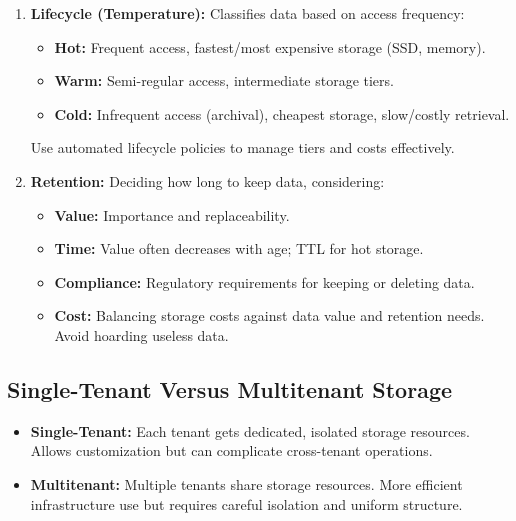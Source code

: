 \begin{enumerate}
    \item \textbf{Lifecycle (Temperature):} Classifies data based on
    access frequency:
    \begin{itemize}
        \item \textbf{Hot:} Frequent access, fastest/most expensive storage
        (SSD, memory).
        \item \textbf{Warm:} Semi-regular access, intermediate storage tiers.
        \item \textbf{Cold:} Infrequent access (archival), cheapest storage,
        slow/costly retrieval.
    \end{itemize}
    Use automated lifecycle policies to manage tiers and costs effectively.

    \item \textbf{Retention:} Deciding how long to keep data, considering: 
    \begin{itemize}
        \item \textbf{Value:} Importance and replaceability.
        \item \textbf{Time:} Value often decreases with age; TTL for hot
        storage.
        \item \textbf{Compliance:} Regulatory requirements for keeping or
        deleting data.
        \item \textbf{Cost:} Balancing storage costs against data value and
        retention needs. Avoid hoarding useless data.
    \end{itemize}

\end{enumerate}



\subsection*{Single-Tenant Versus Multitenant Storage}

\begin{itemize}
    \item \textbf{Single-Tenant:} Each tenant gets dedicated, isolated
    storage resources. Allows customization but can complicate cross-tenant
    operations.

    \item \textbf{Multitenant:} Multiple tenants share storage resources.
    More efficient infrastructure use but requires careful isolation and
    uniform structure.
\end{itemize}





